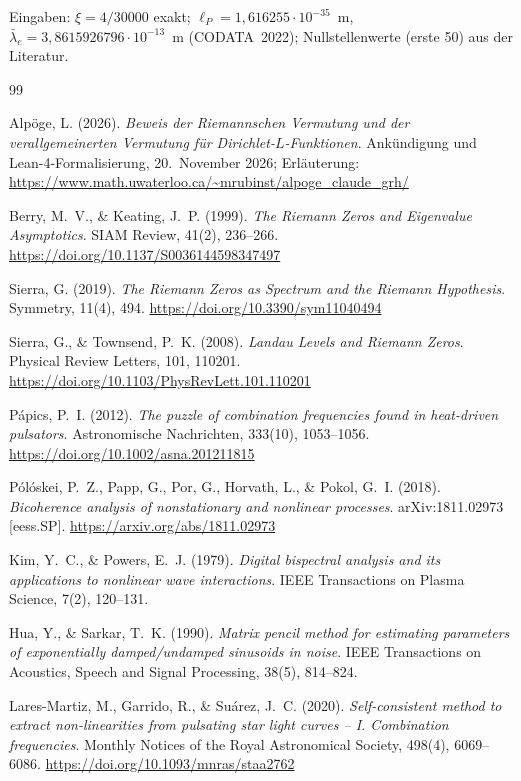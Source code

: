 Eingaben: $\xi = 4/30000$ exakt; $\ell_P = 1{,}616255\cdot10^{-35}$~m,
$\bar\lambda_e = 3{,}8615926796\cdot10^{-13}$~m (CODATA~2022);
Nullstellenwerte (erste 50) aus der Literatur.

\begin{thebibliography}{99}

Alpöge, L. (2026).
\textit{Beweis der Riemannschen Vermutung und der verallgemeinerten Vermutung für Dirichlet-$L$-Funktionen}.
Ankündigung und Lean-4-Formalisierung, 20.~November 2026; Erläuterung:
\url{https://www.math.uwaterloo.ca/~mrubinst/alpoge_claude_grh/}

Berry, M.~V., \& Keating, J.~P. (1999).
\textit{The Riemann Zeros and Eigenvalue Asymptotics}.
SIAM Review, 41(2), 236--266.
\url{https://doi.org/10.1137/S0036144598347497}

Sierra, G. (2019).
\textit{The Riemann Zeros as Spectrum and the Riemann Hypothesis}.
Symmetry, 11(4), 494.
\url{https://doi.org/10.3390/sym11040494}

Sierra, G., \& Townsend, P.~K. (2008).
\textit{Landau Levels and Riemann Zeros}.
Physical Review Letters, 101, 110201.
\url{https://doi.org/10.1103/PhysRevLett.101.110201}

P\'apics, P.~I. (2012).
\textit{The puzzle of combination frequencies found in heat-driven
pulsators}.
Astronomische Nachrichten, 333(10), 1053--1056.
\url{https://doi.org/10.1002/asna.201211815}

P\'ol\'oskei, P.~Z., Papp, G., Por, G., Horvath, L., \& Pokol, G.~I.
(2018).
\textit{Bicoherence analysis of nonstationary and nonlinear processes}.
arXiv:1811.02973 [eess.SP].
\url{https://arxiv.org/abs/1811.02973}

Kim, Y.~C., \& Powers, E.~J. (1979).
\textit{Digital bispectral analysis and its applications to nonlinear
wave interactions}.
IEEE Transactions on Plasma Science, 7(2), 120--131.

Hua, Y., \& Sarkar, T.~K. (1990).
\textit{Matrix pencil method for estimating parameters of exponentially
damped/undamped sinusoids in noise}.
IEEE Transactions on Acoustics, Speech and Signal Processing, 38(5),
814--824.

Lares-Martiz, M., Garrido, R., \& Su\'arez, J.~C. (2020).
\textit{Self-consistent method to extract non-linearities from
pulsating star light curves -- I. Combination frequencies}.
Monthly Notices of the Royal Astronomical Society, 498(4), 6069--6086.
\url{https://doi.org/10.1093/mnras/staa2762}


\end{thebibliography}
